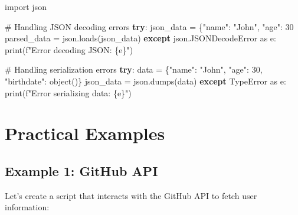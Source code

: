 \documentclass[
  letterpaper,
  DIV=11,
  numbers=noendperiod]{scrreprt}
\newenvironment{Shaded}{\begin{snugshade}}{\end{snugshade}}
\newcommand{\BuiltInTok}[1]{\textcolor[rgb]{0.00,0.23,0.31}{#1}}
\newcommand{\CommentTok}[1]{\textcolor[rgb]{0.37,0.37,0.37}{#1}}
\newcommand{\ControlFlowTok}[1]{\textcolor[rgb]{0.00,0.23,0.31}{\textbf{#1}}}
\newcommand{\DecValTok}[1]{\textcolor[rgb]{0.68,0.00,0.00}{#1}}
\newcommand{\ImportTok}[1]{\textcolor[rgb]{0.00,0.46,0.62}{#1}}
\newcommand{\NormalTok}[1]{\textcolor[rgb]{0.00,0.23,0.31}{#1}}
\newcommand{\OperatorTok}[1]{\textcolor[rgb]{0.37,0.37,0.37}{#1}}
\newcommand{\PreprocessorTok}[1]{\textcolor[rgb]{0.68,0.00,0.00}{#1}}
\newcommand{\SpecialCharTok}[1]{\textcolor[rgb]{0.37,0.37,0.37}{#1}}
\newcommand{\SpecialStringTok}[1]{\textcolor[rgb]{0.13,0.47,0.30}{#1}}
\newcommand{\StringTok}[1]{\textcolor[rgb]{0.13,0.47,0.30}{#1}}
\begin{document}
\begin{Shaded}
\begin{Highlighting}[]
\ImportTok{import}\NormalTok{ json}

\CommentTok{\# Handling JSON decoding errors}
\ControlFlowTok{try}\NormalTok{:}
\NormalTok{    json\_data }\OperatorTok{=} \StringTok{\textquotesingle{}\{"name": "John", "age": 30\textquotesingle{}}
\NormalTok{    parsed\_data }\OperatorTok{=}\NormalTok{ json.loads(json\_data)}
\ControlFlowTok{except}\NormalTok{ json.JSONDecodeError }\ImportTok{as}\NormalTok{ e:}
    \BuiltInTok{print}\NormalTok{(}\SpecialStringTok{f"Error decoding JSON: }\SpecialCharTok{\{}\NormalTok{e}\SpecialCharTok{\}}\SpecialStringTok{"}\NormalTok{)}

\CommentTok{\# Handling serialization errors}
\ControlFlowTok{try}\NormalTok{:}
\NormalTok{    data }\OperatorTok{=}\NormalTok{ \{}\StringTok{"name"}\NormalTok{: }\StringTok{"John"}\NormalTok{, }\StringTok{"age"}\NormalTok{: }\DecValTok{30}\NormalTok{, }\StringTok{"birthdate"}\NormalTok{: }\BuiltInTok{object}\NormalTok{()\}}
\NormalTok{    json\_data }\OperatorTok{=}\NormalTok{ json.dumps(data)}
\ControlFlowTok{except} \PreprocessorTok{TypeError} \ImportTok{as}\NormalTok{ e:}
    \BuiltInTok{print}\NormalTok{(}\SpecialStringTok{f"Error serializing data: }\SpecialCharTok{\{}\NormalTok{e}\SpecialCharTok{\}}\SpecialStringTok{"}\NormalTok{)}
\end{Highlighting}
\end{Shaded}

\section{Practical Examples}\label{practical-examples-3}

\subsection{Example 1: GitHub API}\label{example-1-github-api}

Let's create a script that interacts with the GitHub API to fetch user
information:
\end{document}

